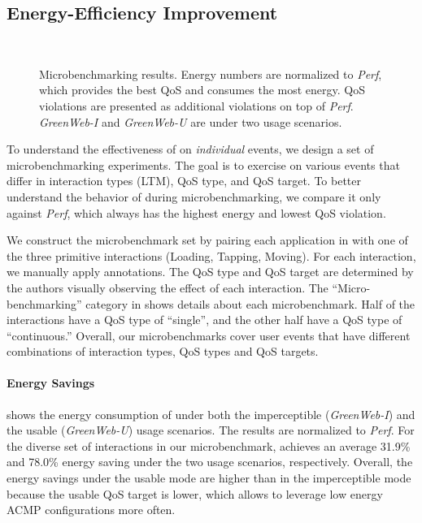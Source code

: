 \subsection{Energy-Efficiency Improvement}
\label{sec:lang:eval:effect}

\begin{figure}[p]
\centering
{}\\
\vspace*{25pt}
\caption{\small Microbenchmarking results. Energy numbers are normalized to \textit{Perf}, which provides the best QoS and consumes the most energy. QoS violations are presented as additional violations on top of \textit{Perf}. \textit{GreenWeb-I} and \textit{GreenWeb-U} are \greenweb under two usage scenarios.}
\label{fig:ubenchmark_results}
\end{figure}

To understand the effectiveness of \greenweb on \textit{individual} events, we design a set of microbenchmarking experiments. The goal is to exercise \greenweb on various events that differ in interaction types (LTM), QoS type, and QoS target. To better understand the behavior of \greenweb during microbenchmarking, we compare it only against \textit{Perf}, which always has the highest energy and lowest QoS violation.

We construct the microbenchmark set by pairing each application in  with one of the three primitive interactions (Loading, Tapping, Moving). For each interaction, we manually apply \greenweb annotations. The QoS type and QoS target are determined by the authors visually observing the effect of each interaction. The ``Micro-benchmarking'' category in  shows details about each microbenchmark. Half of the interactions have a QoS type of ``single'', and the other half have a QoS type of ``continuous.'' Overall, our microbenchmarks cover user events that have different combinations of interaction types, QoS types and QoS targets. 

\paragraph{Energy Savings}  shows the energy consumption of \greenweb under both the imperceptible (\textit{GreenWeb-I}) and the usable (\textit{GreenWeb-U}) usage scenarios. The results are normalized to \textit{Perf}. For the diverse set of interactions in our microbenchmark, \greenweb achieves an average 31.9\% and 78.0\% energy saving under the two usage scenarios, respectively. Overall, the energy savings under the usable mode are higher than in the imperceptible mode because the usable QoS target is lower, which allows \greenweb to leverage low energy ACMP configurations more often.

